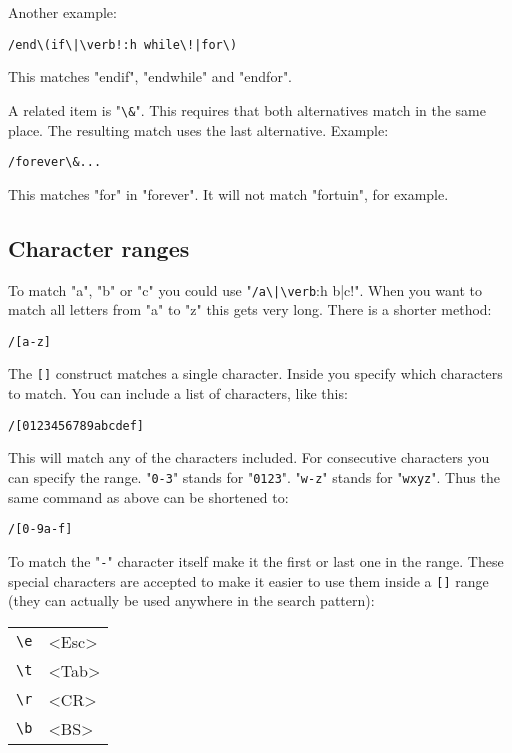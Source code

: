 Another example:

\begin{Verbatim}[samepage=true]
 /end\(if\|\verb!:h while\!|for\)
\end{Verbatim}

This matches "endif", "endwhile" and "endfor".

A related item is "\verb!\&!".
This requires that both alternatives match in the same place.
The resulting match uses the last alternative.
Example:

\begin{Verbatim}[samepage=true]
 /forever\&...
\end{Verbatim}

This matches "for" in "forever".  It will not match "fortuin", for example.
\subsection{Character ranges}
To match "a", "b" or "c" you could use "\verb!/a\|\verb!:h b\!|c!".
When you want to match all letters from "a" to "z" this gets very long.
There is a shorter method:

\begin{Verbatim}[samepage=true]
 /[a-z]
\end{Verbatim}

The \verb![]! construct matches a single character.
Inside you specify which characters to match.
You can include a list of characters, like this:

\begin{Verbatim}[samepage=true]
 /[0123456789abcdef]
\end{Verbatim}

This will match any of the characters included.
For consecutive characters you can specify the range.
"\verb!0-3!" stands for "\verb!0123!".
"\verb!w-z!" stands for "\verb!wxyz!".
Thus the same command as above can be shortened to:

\begin{Verbatim}[samepage=true]
 /[0-9a-f]
\end{Verbatim}

To match the "\verb!-!" character itself make it the first or last one in the range.
These special characters are accepted to make it easier to use them inside a \verb![]! range (they can actually be used anywhere in the search pattern):

\begin{center} \begin{tabular}{c l}
				\verb!\e! & <Esc> \\
				\verb!\t! & <Tab> \\
				\verb!\r! & <CR>  \\
				\verb!\b! & <BS>  \\
\end{tabular} \end{center}

